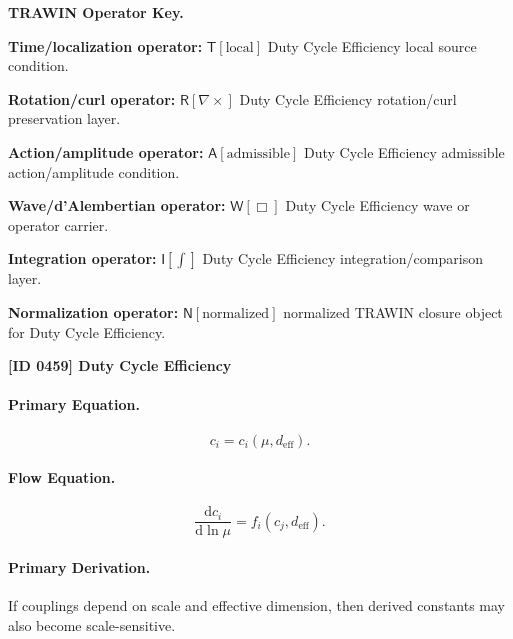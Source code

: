 \par\vspace{0.45\baselineskip}
\noindent\begin{minipage}[t]{\linewidth}
\begingroup
\small
\raggedright
\textbf{TRAWIN Operator Key.}\par
\noindent\textbf{Time/localization operator:} $\mathsf{T}\!\left[\mathrm{local}\right]$ Duty Cycle Efficiency local source condition.\par
\noindent\textbf{Rotation/curl operator:} $\mathsf{R}\!\left[\nabla\times\right]$ Duty Cycle Efficiency rotation/curl preservation layer.\par
\noindent\textbf{Action/amplitude operator:} $\mathsf{A}\!\left[\mathrm{admissible}\right]$ Duty Cycle Efficiency admissible action/amplitude condition.\par
\noindent\textbf{Wave/d'Alembertian operator:} $\mathsf{W}\!\left[\Box\right]$ Duty Cycle Efficiency wave or operator carrier.\par
\noindent\textbf{Integration operator:} $\mathsf{I}\!\left[\int\right]$ Duty Cycle Efficiency integration/comparison layer.\par
\noindent\textbf{Normalization operator:} $\mathsf{N}\!\left[\mathrm{normalized}\right]$ normalized TRAWIN closure object for Duty Cycle Efficiency.\par
\endgroup
\end{minipage}

\clearpage
\noindent\textbf{[ID 0459] Duty Cycle Efficiency}\par
\vspace{0.35em}
\paragraph{Primary Equation.}
\begin{equation}
c_i=c_i(\mu,d_{\mathrm{eff}}).
\end{equation}

\paragraph{Flow Equation.}
\begin{equation}
\frac{\mathrm{d}c_i}{\mathrm{d}\ln\mu}
=
f_i(c_j,d_{\mathrm{eff}}).
\end{equation}

\paragraph{Primary Derivation.}
If couplings depend on scale and effective dimension, then derived constants may also become scale-sensitive.

